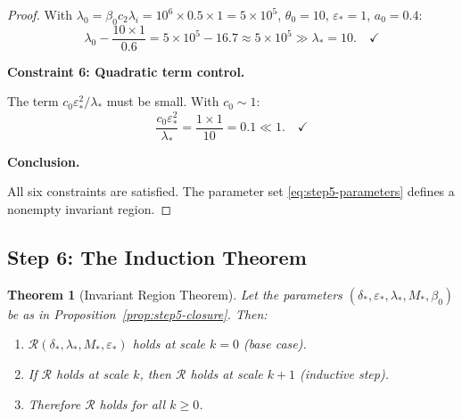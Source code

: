 \documentclass[11pt]{article}
\newtheorem{theorem}{Theorem}[section]
\theoremstyle{definition}
\newcommand{\1}{\mathbf{1}}
\begin{document}
\begin{proof}
With $\lambda_0 = \beta_0 c_2 \lambda_i = 10^6 \times 0.5 \times 1 = 5 \times 10^5$, $\theta_0 = 10$, 
$\varepsilon_* = 1$, $a_0 = 0.4$:
\[
\lambda_0 - \frac{10 \times 1}{0.6} = 5 \times 10^5 - 16.7 \approx 5 \times 10^5 \gg \lambda_* = 10. \quad \checkmark
\]

\textbf{Constraint 6: Quadratic term control.}

The term $c_0 \varepsilon_*^2/\lambda_*$ must be small. With $c_0 \sim 1$:
\[
\frac{c_0 \varepsilon_*^2}{\lambda_*} = \frac{1 \times 1}{10} = 0.1 \ll 1. \quad \checkmark
\]

\textbf{Conclusion.}

All six constraints are satisfied. The parameter set \eqref{eq:step5-parameters} defines a 
nonempty invariant region.
\end{proof}

\subsection{Step 6: The Induction Theorem}

\begin{theorem}[Invariant Region Theorem]\label{thm:step6-induction}
Let the parameters $(\delta_*, \varepsilon_*, \lambda_*, M_*, \beta_0)$ be as in 
Proposition~\ref{prop:step5-closure}. Then:
\begin{enumerate}
\item $\mathcal{R}(\delta_*, \lambda_*, M_*, \varepsilon_*)$ holds at scale $k = 0$ (base case).
\item If $\mathcal{R}$ holds at scale $k$, then $\mathcal{R}$ holds at scale $k+1$ (inductive step).
\item Therefore $\mathcal{R}$ holds for all $k \ge 0$.
\end{enumerate}
\end{theorem}
\end{document}
